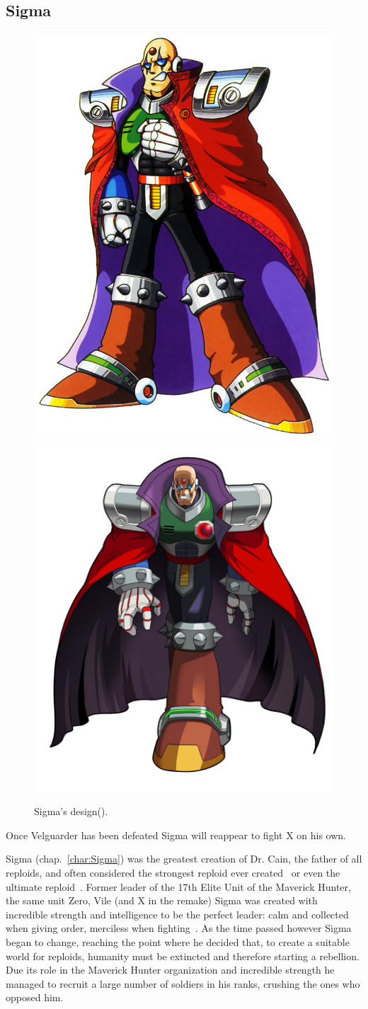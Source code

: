 \subsection{Sigma}\label{boss:Sigma_x1}
\begin{figure}[htp]
	\centering
	\includegraphics[width=0.4\linewidth]{figures/X1/Sigma_stages/Sigma.jpg}
	\includegraphics[width=0.5\linewidth]{figures/X1/Sigma_stages/MHXSigma.jpg}
	\caption{Sigma's design(\cite{book:MMX_Complete_art}).}
\end{figure}
Once Velguarder has been defeated Sigma will reappear to fight X on his own.

Sigma (chap.~\ref{char:Sigma}) was the greatest creation of Dr. Cain, the father of all reploids, and often considered the strongest reploid ever created~\cite{wayback:X_resources} or even the ultimate reploid~\cite{MHX:manual}. Former leader of the 17th Elite Unit of the Maverick Hunter, the same unit Zero, Vile (and X in the remake) Sigma was created with incredible strength and intelligence  to be the perfect leader: calm and collected when giving order, merciless when fighting~\cite{Xcoll1:Manual_X1}. As the time passed however Sigma began to change, reaching the point where he decided that, to create a suitable world for reploids, humanity must be extincted and therefore starting a rebellion. Due its role in the Maverick Hunter organization and incredible strength he managed to recruit a large number of soldiers in his ranks, crushing the ones who opposed him. 

